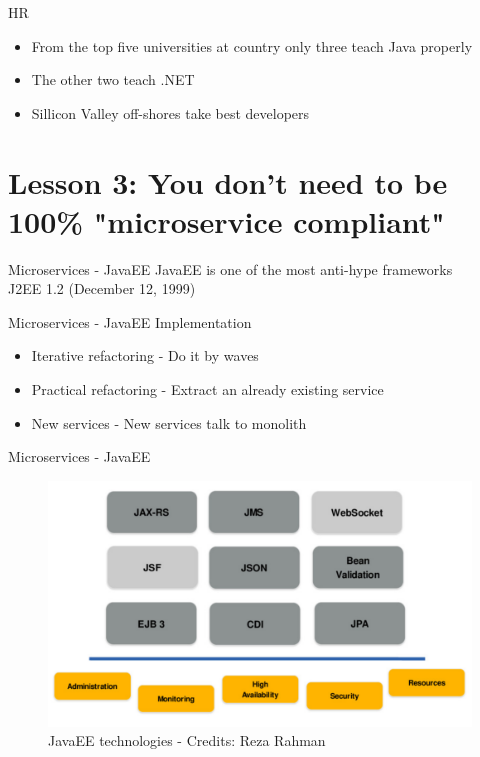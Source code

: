 \documentclass{beamer}
\begin{document}
\begin{frame}{HR}
\begin{itemize}
	\item From the top five universities at country only three teach Java properly
	\item The other two teach .NET
	\item Sillicon Valley off-shores take best developers
\end{itemize}
\end{frame}


\section{Lesson 3: You don't need to be 100\% "microservice compliant"}
\begin{frame}{Microservices - JavaEE}
JavaEE is one of the most anti-hype frameworks\\

\huge J2EE 1.2 (December 12, 1999)
\end{frame}


\begin{frame}{Microservices - JavaEE}
Implementation
\begin{itemize}
	\item Iterative refactoring - Do it by waves
	\item Practical refactoring - Extract an already existing service 
	\item New services - New services talk to monolith
\end{itemize}
\end{frame}


\begin{frame}{Microservices - JavaEE}

\begin{figure}
	\centering
	\includegraphics[width=0.9\linewidth]{Images/javaeemicropancake.png}
	\caption{JavaEE technologies - Credits: Reza Rahman}
\end{figure}
\end{frame}
\end{document}
